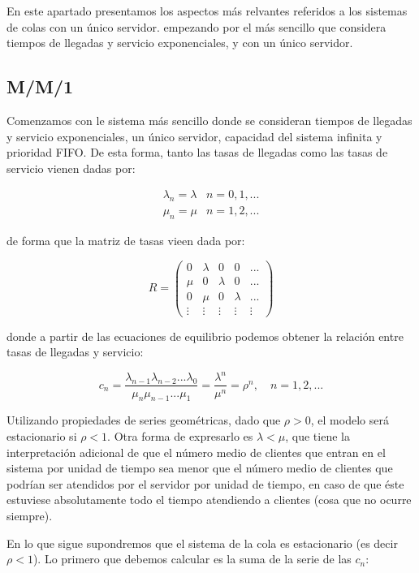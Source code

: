 \documentclass[
]{book}
\theoremstyle{definition}
\theoremstyle{definition}
\theoremstyle{definition}
\theoremstyle{definition}
\theoremstyle{remark}
\begin{document}
En este apartado presentamos los aspectos más relvantes referidos a los sistemas de colas con un único servidor.
empezando por el más sencillo que considera tiempos de llegadas y servicio exponenciales, y con un único servidor.

\hypertarget{mm1}{%
\subsection{M/M/1}\label{mm1}}

Comenzamos con le sistema más sencillo donde se consideran tiempos de llegadas y servicio exponenciales, un único servidor, capacidad del sistema infinita y prioridad FIFO. De esta forma, tanto las tasas de llegadas como las tasas de servicio vienen dadas por:

\[
\begin{matrix}
\lambda_n = \lambda & n = 0, 1,...\\
\mu_n = \mu & n = 1, 2,...
\end{matrix}\]

de forma que la matriz de tasas vieen dada por:

\[
R = \begin{pmatrix}
 0 & \lambda & 0 & 0 & ...\\
\mu & 0 & \lambda & 0 & ...\\
0 & \mu & 0 & \lambda & ...\\
\vdots & \vdots & \vdots & \vdots & \vdots
\end{pmatrix}\]

donde a partir de las ecuaciones de equilibrio podemos obtener la relación entre tasas de llegadas y servicio:

\[c_n = \frac{\lambda_{n-1}\lambda_{n-2}...\lambda_0}{\mu_{n}\mu_{n-1}...\mu_1} = \frac{\lambda^n}{\mu^n} = \rho^n, \quad n = 1, 2,...\]

Utilizando propiedades de series geométricas, dado que \(\rho >0\), el modelo será estacionario si \(\rho < 1\). Otra forma de expresarlo es \(\lambda < \mu\), que tiene la interpretación adicional de que el número medio de clientes que entran en el sistema por unidad de tiempo sea menor que el número medio de clientes que podrían ser atendidos por el servidor por unidad de tiempo, en caso de que éste estuviese absolutamente todo el tiempo atendiendo a clientes (cosa que no ocurre siempre).

En lo que sigue supondremos que el sistema de la cola es estacionario (es decir \(\rho < 1\)). Lo primero que debemos calcular es la suma de la serie de las \(c_n\):
\end{document}
